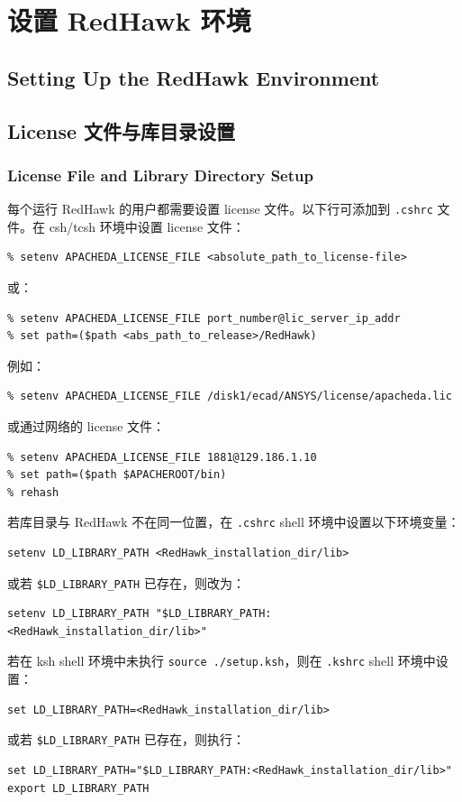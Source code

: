\section{设置 RedHawk 环境}
\subsection*{Setting Up the RedHawk Environment}

\subsection{License 文件与库目录设置}
\subsubsection*{License File and Library Directory Setup}

每个运行 RedHawk 的用户都需要设置 license 文件。以下行可添加到 \texttt{.cshrc} 文件。在 csh/tcsh 环境中设置 license 文件：
\begin{lstlisting}
% setenv APACHEDA_LICENSE_FILE <absolute_path_to_license-file>
\end{lstlisting}
或：
\begin{lstlisting}
% setenv APACHEDA_LICENSE_FILE port_number@lic_server_ip_addr
% set path=($path <abs_path_to_release>/RedHawk)
\end{lstlisting}

例如：
\begin{lstlisting}
% setenv APACHEDA_LICENSE_FILE /disk1/ecad/ANSYS/license/apacheda.lic
\end{lstlisting}
或通过网络的 license 文件：
\begin{lstlisting}
% setenv APACHEDA_LICENSE_FILE 1881@129.186.1.10
% set path=($path $APACHEROOT/bin)
% rehash
\end{lstlisting}

若库目录与 RedHawk 不在同一位置，在 \texttt{.cshrc} shell 环境中设置以下环境变量：
\begin{lstlisting}
setenv LD_LIBRARY_PATH <RedHawk_installation_dir/lib>
\end{lstlisting}
或若 \texttt{\$LD\_LIBRARY\_PATH} 已存在，则改为：
\begin{lstlisting}
setenv LD_LIBRARY_PATH "$LD_LIBRARY_PATH:<RedHawk_installation_dir/lib>"
\end{lstlisting}

若在 ksh shell 环境中未执行 \texttt{source ./setup.ksh}，则在 \texttt{.kshrc} shell 环境中设置：
\begin{lstlisting}
set LD_LIBRARY_PATH=<RedHawk_installation_dir/lib>
\end{lstlisting}
或若 \texttt{\$LD\_LIBRARY\_PATH} 已存在，则执行：
\begin{lstlisting}
set LD_LIBRARY_PATH="$LD_LIBRARY_PATH:<RedHawk_installation_dir/lib>"
export LD_LIBRARY_PATH
\end{lstlisting}

